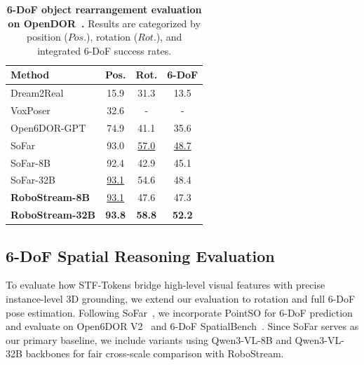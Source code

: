 \begin{table}[t]
\begin{minipage}[t]{0.42\textwidth}
        \caption{\textbf{6-DoF object rea\-r\-r\-a\-n\-g\-e\-m\-e\-n\-t evaluation on O\-p\-e\-n\-D\-O\-R~\cite{ding2024open6dor}.} Results are categorized by position ($Pos.$), rotation ($Rot.$), and integrated 6-DoF success rates. }
        \label{tab:open6dor_updated}
        \scriptsize 
        \begin{tabular}{@{}lccc@{}}
        \toprule
        Method & Pos.  & Rot.  & 6-DoF  \\
        \midrule
        Dream2Real~\cite{kapelyukh2024dream2real}         & 15.9 & 31.3 & 13.5 \\
        VoxPoser~\cite{huang2023voxposer}            & 32.6 & -    & -    \\
        Open6DOR-GPT~\cite{ding2024open6dor}       & 74.9 & 41.1 & 35.6 \\
        SoFar~\cite{qisofar}          & 93.0 & \cellcolor{secondpurple}\underline{57.0} & \cellcolor{secondpurple}\underline{48.7} \\
        SoFar-8B~\cite{qisofar}               & 92.4 & 42.9 & 45.1 \\
        SoFar-32B~\cite{qisofar}              & \cellcolor{secondpurple}\underline{93.1} & 54.6 & 48.4 \\
        \textbf{RoboStream-8B}          & \cellcolor{secondpurple}\underline{93.1} & 47.6 & 47.3 \\
        \textbf{RoboStream-32B}& \cellcolor{firstpurple}\textbf{93.8} & \cellcolor{firstpurple}\textbf{58.8} & \cellcolor{firstpurple}\textbf{52.2} \\
        \bottomrule
        \end{tabular}
    \end{minipage}
\end{table}



\subsection{6-DoF Spatial Reasoning Evaluation}
\label{sec:spatial_reasoning}
To evaluate how STF-Tokens bridge high-level visual features with precise instance-level 3D grounding, we extend our evaluation to rotation and full 6-DoF pose estimation. Following SoFar~\cite{qisofar}, we incorporate PointSO for 6-DoF prediction and evaluate on Open6DOR V2~\cite{ding2024open6dor} and 6-DoF SpatialBench~\cite{qisofar}. Since SoFar serves as our primary baseline, we include variants using Qwen3-VL-8B and Qwen3-VL-32B backbones for fair cross-scale comparison with RoboStream.



